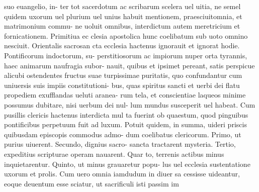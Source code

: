 \documentclass{article}
\begin{document}
\begin{pages}
suo euangelio, in- ter tot sacerdotum ac scribarum scelera uel uitia, ne semel quidem uxorum uel plurium uel unius habuit mentionem, praesciuitomnia, et matrimonium commu- ne uoluit omnibus, interdictum autem meretricium et fornicationem. Primitiua ec clesia apostolica hunc coelibatum sub uoto omnino nesciuit. Orientalis sacrosan cta ecclesia hactenus ignorauit et ignorat hodie. Pontificorum indoctorum, su- perstitiosorum ac impiorum nuper orta tyrannis, haec animarum naufragia subor- nauit, quibus et ipsimet pereant, satis perspicue alicubi ostendentes fructus suae turpissimae puritatis, quo confundantur cum uniuersis suis impiis constitutioni- bus, quas spiritus sancti et uerbi dei flatu propediem exufflandas ueluti aranea- rum tela, et conscientiae laqueos minime possumus dubitare, nisi uerbum dei nul- lum mundus susceperit uel habeat. Cum pusillis clericis hactenus interdicta mul ta fuerint ob quaestum, quod pinguibus pontificibus perpetuum fuit ad luxum. Potuit quidem, in summa, uideri priscis quibusdam episcopis commodus admo- dum coelibatus clericorum. Primo, ut purius uiuerent. Secundo, dignius sacro- sancta tractarent mysteria. Tertio, expeditius scripturae operam nauarent. Quar to, terrenis actibus minus inquietarentur. Quinto, ut minus grauaretur popu- lus uel ecclesia sustentatione uxorum et prolis. Cum uero omnia iamdudum in diuer sa cessisse uideantur, eoque deuentum esse sciatur, ut sacrificuli isti passim im  \pend

\end{pages}
\end{document}
